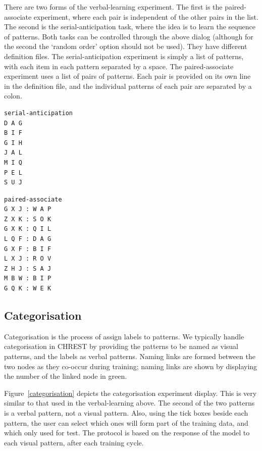 \documentclass{article}
\begin{document}
There are two forms of the verbal-learning experiment.  The first is the
paired-associate experiment, where each pair is independent of the other pairs
in the list.  The second is the serial-anticipation task, where the idea is to
learn the sequence of patterns.  Both tasks can be controlled through the above
dialog (although for the second the `random order' option should not be used).
They have different definition files.  The serial-anticipation experiment is
simply a list of patterns, with each item in each pattern separated by a space.
The paired-associate experiment uses a list of pairs of patterns.  Each pair is
provided on its own line in the definition file, and the individual patterns of
each pair are separated by a colon.

\begin{verbatim}
serial-anticipation 
D A G 
B I F 
G I H 
J A L 
M I Q 
P E L 
S U J
\end{verbatim} 

\begin{verbatim}
paired-associate 
G X J : W A P 
Z X K : S O K 
G X K : Q I L 
L Q F : D A G 
G X F : B I F 
L X J : R O V 
Z H J : S A J 
M B W : B I P 
G Q K : W E K
\end{verbatim}

\subsection{Categorisation}

Categorisation is the process of assign labels to patterns.  We typically
handle categorisation in CHREST by providing the patterns to be named as visual
patterns, and the labels as verbal patterns.  Naming links are formed between
the two nodes as they co-occur during training; naming links are shown by
displaying the number of the linked node in green.

Figure~\ref{categorisation} depicts the categorisation experiment display.
This is very similar to that used in the verbal-learning above.  The second of
the two patterns is a verbal pattern, not a visual pattern.  Also, using the
tick boxes beside each pattern, the user can select which ones will form part
of the training data, and which only used for test.  The protocol is based on
the response of the model to each visual pattern, after each training cycle.
\end{document}
